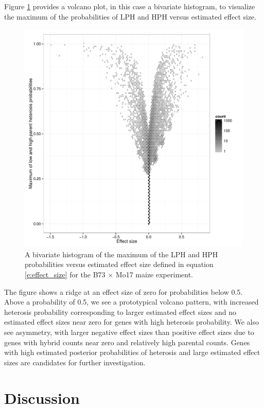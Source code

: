 \documentclass[useAMS,usenatbib,referee]{biom}
\begin{document}
Figure \ref{f:volcano} provides a volcano plot, in this case a bivariate histogram, to visualize the maximum of the probabilities of LPH and HPH versus estimated effect size. 
\begin{figure}
\centerline{\includegraphics[width=\textwidth]{volcano}}
\caption{A bivariate histogram of the maximum of the LPH and HPH probabilities versus estimated effect size defined in equation \eqref{e:effect_size} for the B73 $\times$ Mo17 maize experiment.}
\label{f:volcano}
\end{figure}
The figure shows a ridge at an effect size of zero for probabilities below 0.5. Above a probability of 0.5, we see a prototypical volcano pattern, with increased heterosis probability corresponding to larger estimated effect sizes and no estimated effect sizes near zero for genes with high heterosis probability. We also see asymmetry, with larger negative effect sizes than positive effect sizes due to genes with hybrid counts near zero and relatively high parental counts. Genes with high estimated posterior probabilities of heterosis and large estimated effect sizes are candidates for further investigation.






\section{Discussion}
\label{s:discussion}
\end{document}

